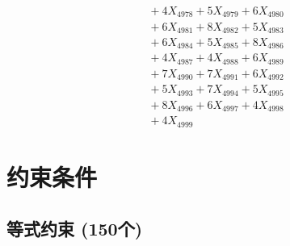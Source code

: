 \documentclass[a4paper,10pt]{article}
\begin{document}
{\begin{align}
&\;  + 4 X_{4978} + 5 X_{4979} + 6 X_{4980} \\[0.3ex]
&\;  + 6 X_{4981} + 8 X_{4982} + 5 X_{4983} \\[0.3ex]
&\;  + 6 X_{4984} + 5 X_{4985} + 8 X_{4986} \\[0.3ex]
&\;  + 4 X_{4987} + 4 X_{4988} + 6 X_{4989} \\[0.5ex]\allowbreak
&\;  + 7 X_{4990} + 7 X_{4991} + 6 X_{4992} \\[0.3ex]
&\;  + 5 X_{4993} + 7 X_{4994} + 5 X_{4995} \\[0.3ex]
&\;  + 8 X_{4996} + 6 X_{4997} + 4 X_{4998} \\[0.3ex]
&\;  + 4 X_{4999}\nonumber
\end{align}
}

\section{约束条件}

\subsection{等式约束 (150个)}
\end{document}
